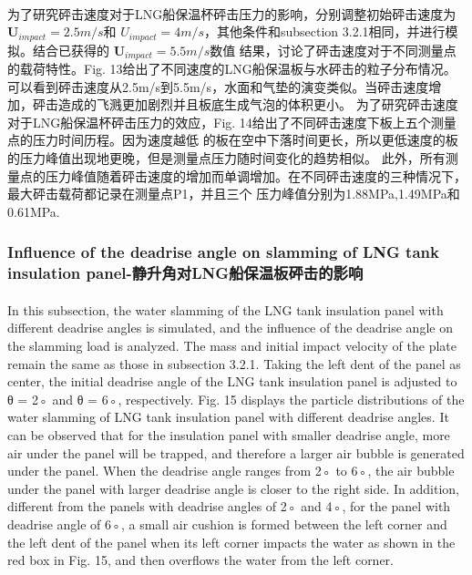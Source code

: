 \documentclass[UTF8]{ctexart}
\begin{document}
\paragraph{\quad}为了研究砰击速度对于LNG船保温杯砰击压力的影响，分别调整初始砰击速度为 $\mathbf{U}_{impact} = 2.5m/s$和 
                $U_{impact} = 4m/s$，其他条件和subsection 3.2.1相同，并进行模拟。结合已获得的 $\mathbf{U}_{impact} = 5.5m/s$数值
                结果，讨论了砰击速度对于不同测量点的载荷特性。Fig. 13给出了不同速度的LNG船保温板与水砰击的粒子分布情况。
                可以看到砰击速度从2.5m/s到5.5m/s，水面和气垫的演变类似。当砰击速度增加，砰击造成的飞溅更加剧烈并且板底生成气泡的体积更小。
                为了研究砰击速度对于LNG船保温杯砰击压力的效应，Fig. 14给出了不同砰击速度下板上五个测量点的压力时间历程。因为速度越低
                的板在空中下落时间更长，所以更低速度的板的压力峰值出现地更晚，但是测量点压力随时间变化的趋势相似。
                此外，所有测量点的压力峰值随着砰击速度的增加而单调增加。在不同砰击速度的三种情况下，最大砰击载荷都记录在测量点P1，并且三个
                压力峰值分别为1.88MPa,1.49MPa和0.61MPa.

\subsubsection{Influence of the deadrise angle on slamming of LNG tank insulation panel-静升角对LNG船保温板砰击的影响}
\paragraph{\quad}In this subsection, the water slamming of the LNG tank insulation panel with different 
                deadrise angles is simulated, and the influence of the deadrise angle on the slamming load is analyzed. 
                The mass and initial impact velocity of the plate remain the same as those in subsection 3.2.1. Taking 
                the left dent of the panel as center, the initial deadrise angle of the LNG tank insulation panel is 
                adjusted to θ = 2◦ and θ = 6◦, respectively. Fig. 15 displays the particle distributions of the water 
                slamming of LNG tank insulation panel with different deadrise angles. It can be observed that for the 
                insulation panel with smaller deadrise angle, more air under the panel will be trapped, and therefore a 
                larger air bubble is generated under the panel. When the deadrise angle ranges from 2◦ to 6◦, the air bubble 
                under the panel with larger deadrise angle is closer to the right side. In addition, different from the panels 
                with deadrise angles of 2◦ and 4◦, for the panel with deadrise angle of 6◦, a small air cushion is formed 
                between the left corner and the left dent of the panel when its left corner impacts the water as shown in 
                the red box in Fig. 15, and then overflows the water from the left corner.
\end{document}

